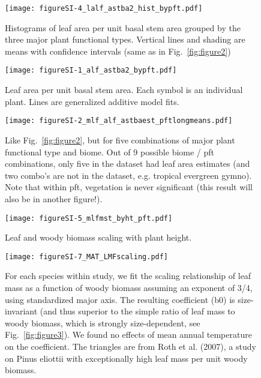 \documentclass[a4paper]{article}
\begin{document}
\begin{figure}[h!]
    \centering
    \texttt{[image: figureSI-4\_lalf\_astba2\_hist\_bypft.pdf]}
    \caption{Histograms of leaf area per unit basal stem area grouped by the three major plant functional types. Vertical lines and shading are means with confidence intervals (same as in Fig.~\ref{fig:figure2})}
    \label{fig:figureSI4}
\end{figure}


\begin{figure}[h!]
    \centering
    \texttt{[image: figureSI-1\_alf\_astba2\_bypft.pdf]}
    \caption{Leaf area per unit basal stem area. Each symbol is an individual plant. Lines are generalized additive model fits.}
    \label{fig:figureSI1}
\end{figure}

\begin{figure}[h!]
    \centering
    \texttt{[image: figureSI-2\_mlf\_alf\_astbaest\_pftlongmeans.pdf]}
    \caption{Like Fig.~\ref{fig:figure2}, but for five combinations of major plant functional type and biome. Out of 9 possible biome / pft combinations, only five in the dataset had leaf area estimates (and two combo's are not in the dataset, e.g. tropical evergreen gymno). Note that within pft, vegetation is never significant (this result will also be in another figure!).}
    \label{fig:figureSI2}
\end{figure}


\begin{figure}[h!]
    \centering
    \texttt{[image: figureSI-5\_mlfmst\_byht\_pft.pdf]}
    \caption{Leaf and woody biomass scaling with plant height.}
    \label{fig:figureSI5}
\end{figure}

\begin{figure}[h!]
    \centering
    \texttt{[image: figureSI-7\_MAT\_LMFscaling.pdf]}
    \caption{For each species within study, we fit the scaling relationship of leaf mass as a function of woody biomass assuming an exponent of 3/4, using standardized major axis. The resulting coefficient (b0) is size-invariant (and thus superior to the simple ratio of leaf mass to woody biomass, which is strongly size-dependent, see Fig.~\ref{fig:figure3}). We found no effects of mean annual temperature on the coefficient. The triangles are from Roth et al. (2007), a study on Pinus eliottii with exceptionally high leaf mass per unit woody biomass.}
    \label{fig:figureSI7}
\end{figure}




\clearpage

\end{document}
